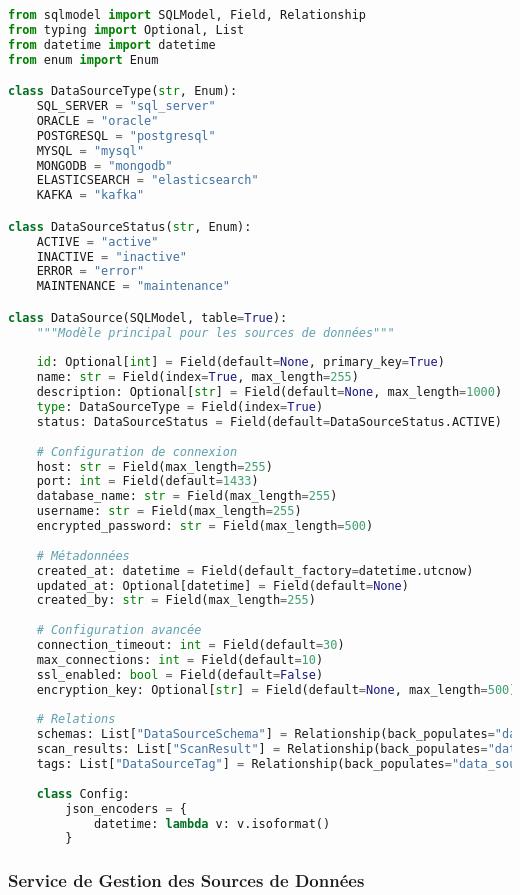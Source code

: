 \begin{lstlisting}[language=Python, caption=Modèle DataSource principal]
from sqlmodel import SQLModel, Field, Relationship
from typing import Optional, List
from datetime import datetime
from enum import Enum

class DataSourceType(str, Enum):
    SQL_SERVER = "sql_server"
    ORACLE = "oracle"
    POSTGRESQL = "postgresql"
    MYSQL = "mysql"
    MONGODB = "mongodb"
    ELASTICSEARCH = "elasticsearch"
    KAFKA = "kafka"

class DataSourceStatus(str, Enum):
    ACTIVE = "active"
    INACTIVE = "inactive"
    ERROR = "error"
    MAINTENANCE = "maintenance"

class DataSource(SQLModel, table=True):
    """Modèle principal pour les sources de données"""
    
    id: Optional[int] = Field(default=None, primary_key=True)
    name: str = Field(index=True, max_length=255)
    description: Optional[str] = Field(default=None, max_length=1000)
    type: DataSourceType = Field(index=True)
    status: DataSourceStatus = Field(default=DataSourceStatus.ACTIVE)
    
    # Configuration de connexion
    host: str = Field(max_length=255)
    port: int = Field(default=1433)
    database_name: str = Field(max_length=255)
    username: str = Field(max_length=255)
    encrypted_password: str = Field(max_length=500)
    
    # Métadonnées
    created_at: datetime = Field(default_factory=datetime.utcnow)
    updated_at: Optional[datetime] = Field(default=None)
    created_by: str = Field(max_length=255)
    
    # Configuration avancée
    connection_timeout: int = Field(default=30)
    max_connections: int = Field(default=10)
    ssl_enabled: bool = Field(default=False)
    encryption_key: Optional[str] = Field(default=None, max_length=500)
    
    # Relations
    schemas: List["DataSourceSchema"] = Relationship(back_populates="data_source")
    scan_results: List["ScanResult"] = Relationship(back_populates="data_source")
    tags: List["DataSourceTag"] = Relationship(back_populates="data_source")
    
    class Config:
        json_encoders = {
            datetime: lambda v: v.isoformat()
        }
\end{lstlisting}

\subsubsection{Service de Gestion des Sources de Données}

